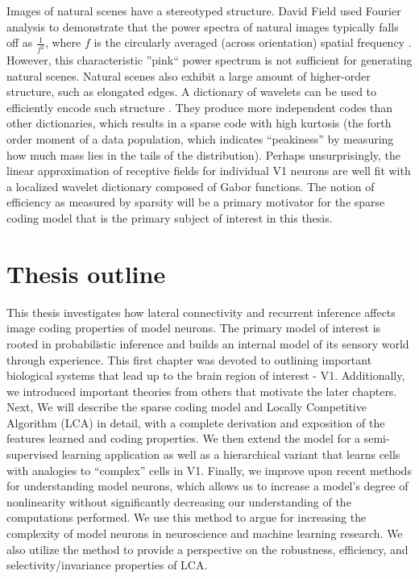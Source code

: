 Images of natural scenes have a stereotyped structure. David Field used Fourier analysis to demonstrate that the power spectra of natural images typically falls off as $\tfrac{1}{f^{2}}$, where $f$ is the circularly averaged (across orientation) spatial frequency \parencite{field1987relations}. However, this characteristic ''pink`` power spectrum is not sufficient for generating natural scenes. Natural scenes also exhibit a large amount of higher-order structure, such as elongated edges. A dictionary of wavelets can be used to efficiently encode such structure \parencite{field1999wavelets}. They produce more independent codes than other dictionaries, which results in a sparse code with high kurtosis (the forth order moment of a data population, which indicates ``peakiness'' by measuring how much mass lies in the tails of the distribution). Perhaps unsurprisingly, the linear approximation of receptive fields for individual V1 neurons are well fit with a localized wavelet dictionary composed of Gabor functions. The notion of efficiency as measured by sparsity will be a primary motivator for the sparse coding model that is the primary subject of interest in this thesis.

\section{Thesis outline}
This thesis investigates how lateral connectivity and recurrent inference affects image coding properties of model neurons. The primary model of interest is rooted in probabilistic inference and builds an internal model of its sensory world through experience. This first chapter was devoted to outlining important biological systems that lead up to the brain region of interest - V1. Additionally, we introduced important theories from others that motivate the later chapters. Next, We will describe the sparse coding model and Locally Competitive Algorithm (LCA) in detail, with a complete derivation and exposition of the features learned and coding properties. We then extend the model for a semi-supervised learning application as well as a hierarchical variant that learns cells with analogies to ``complex'' cells in V1. Finally, we improve upon recent methods for understanding model neurons, which allows us to increase a model's degree of nonlinearity without significantly decreasing our understanding of the computations performed. We use this method to argue for increasing the complexity of model neurons in neuroscience and machine learning research. We also utilize the method to provide a perspective on the robustness, efficiency, and selectivity/invariance properties of LCA.